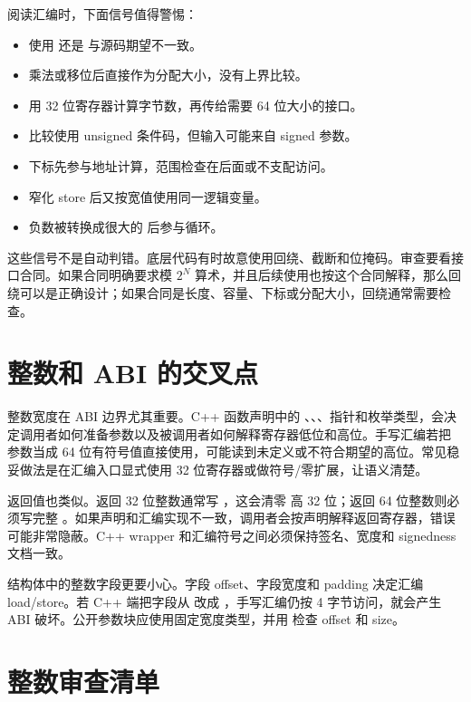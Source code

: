 阅读汇编时，下面信号值得警惕：

\begin{itemize}
  \item 使用  还是  与源码期望不一致。
  \item 乘法或移位后直接作为分配大小，没有上界比较。
  \item 用 32 位寄存器计算字节数，再传给需要 64 位大小的接口。
  \item 比较使用 unsigned 条件码，但输入可能来自 signed 参数。
  \item 下标先参与地址计算，范围检查在后面或不支配访问。
  \item 窄化 store 后又按宽值使用同一逻辑变量。
  \item 负数被转换成很大的  后参与循环。
\end{itemize}

这些信号不是自动判错。底层代码有时故意使用回绕、截断和位掩码。审查要看接口合同。如果合同明确要求模 \(2^N\) 算术，并且后续使用也按这个合同解释，那么回绕可以是正确设计；如果合同是长度、容量、下标或分配大小，回绕通常需要检查。

\section{整数和 ABI 的交叉点}

整数宽度在 ABI 边界尤其重要。C++ 函数声明中的 、、、指针和枚举类型，会决定调用者如何准备参数以及被调用者如何解释寄存器低位和高位。手写汇编若把  参数当成 64 位有符号值直接使用，可能读到未定义或不符合期望的高位。常见稳妥做法是在汇编入口显式使用 32 位寄存器或做符号/零扩展，让语义清楚。

返回值也类似。返回 32 位整数通常写 ，这会清零  高 32 位；返回 64 位整数则必须写完整 。如果声明和汇编实现不一致，调用者会按声明解释返回寄存器，错误可能非常隐蔽。C++ wrapper 和汇编符号之间必须保持签名、宽度和 signedness 文档一致。

结构体中的整数字段更要小心。字段 offset、字段宽度和 padding 决定汇编 load/store。若 C++ 端把字段从  改成 ，手写汇编仍按 4 字节访问，就会产生 ABI 破坏。公开参数块应使用固定宽度类型，并用  检查 offset 和 size。

\section{整数审查清单}

